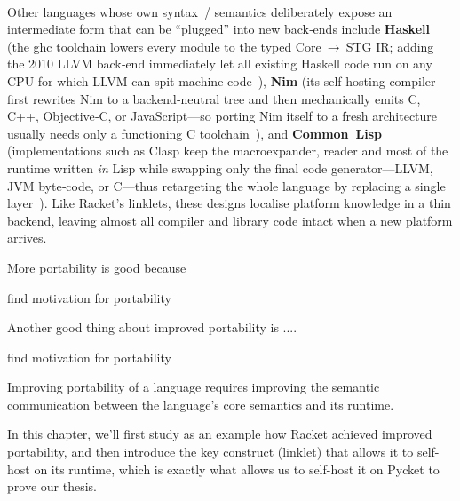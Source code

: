 	\paragraph{}%
		Other languages whose own syntax / semantics deliberately expose an intermediate form that can be “plugged” into new back‑ends include \textbf{Haskell} (the \gls{ghc} toolchain lowers every module to the typed Core → STG IR; adding the 2010 LLVM back‑end immediately let all existing Haskell code run on any CPU for which LLVM can spit machine code \cite{ghc_llvm_backend}), \textbf{Nim} (its self‑hosting compiler first rewrites Nim to a backend‑neutral tree and then mechanically emits C, C++, Objective‑C, or JavaScript—so porting Nim itself to a fresh architecture usually needs only a functioning C toolchain \cite{nim_porting}), and \textbf{Common Lisp} (implementations such as Clasp keep the macroexpander, reader and most of the runtime written \emph{in} Lisp while swapping only the final code generator—LLVM, JVM byte‑code, or C—thus retargeting the whole language by replacing a single layer \cite{clasp_llvm}).  Like Racket’s linklets, these designs localise platform knowledge in a thin backend, leaving almost all compiler and library code intact when a new platform arrives.


	\begin{paragraph-here}
		More portability is good because

		\begin{todo}
			find motivation for portability
		\end{todo}
	\end{paragraph-here}

	\begin{paragraph-here}
		Another good thing about improved portability is ....

		\begin{todo}
			find motivation for portability
		\end{todo}
	\end{paragraph-here}

	\begin{paragraph-here}
		Improving portability of a language requires improving the semantic communication between the language's core semantics and its runtime.
	\end{paragraph-here}

	\begin{paragraph-here}
		 In this chapter, we'll first study as an example how Racket achieved improved portability, and then introduce the key construct (linklet) that allows it to self-host on its runtime, which is exactly what allows us to self-host it on Pycket to prove our thesis.
	\end{paragraph-here}

